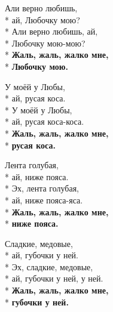 \medskip

\begin{minipage}{\linewidth}
Али верно любишь,\\*
ай, Любочку мою?\\*
Али верно любишь, ай,\\*
Любочку мою-мою?\\*
\textbf{Жаль, жаль, жалко мне,}\\*
\textbf{Любочку мою.}\\
\end{minipage}\par\medskip\nobreak

\medskip

\begin{minipage}{\linewidth}
У моёй у Любы,\\*
ай, русая коса.\\*
У моёй у Любы,\\*
ай, русая коса-коса.\\*
\textbf{Жаль, жаль, жалко мне,}\\*
\textbf{русая коса.}\\
\end{minipage}\par\medskip\nobreak

\medskip

\begin{minipage}{\linewidth}
Лента голубая,\\*
ай, ниже пояса.\\*
Эх, лента голубая,\\*
ай, ниже пояса-яса.\\*
\textbf{Жаль, жаль, жалко мне,}\\*
\textbf{ниже пояса.}\\
\end{minipage}\par\medskip\nobreak

\medskip

\begin{minipage}{\linewidth}
Сладкие, медовые,\\*
ай, губочки у ней.\\*
Эх, сладкие, медовые,\\*
ай, губочки у ней, у ней.\\*
\textbf{Жаль, жаль, жалко мне,}\\*
\textbf{губочки у ней.}\\
\end{minipage}\par\medskip\nobreak

